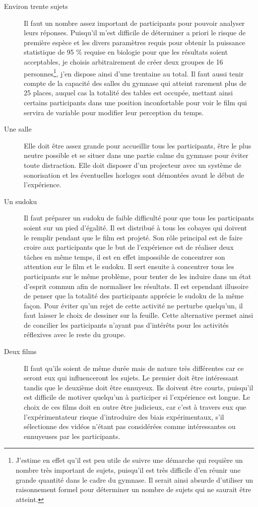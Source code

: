 \documentclass[12pt,fleqn,oneside,french,openany]{book} %
\begin{document}
\begin{description}
	\item[Environ trente sujets] Il faut un nombre assez important de participants pour pouvoir analyser leurs réponses. Puisqu'il m'est difficile de déterminer a priori le risque de première espèce et les divers paramètres requis pour obtenir la puissance statistique de 95 \% requise en biologie pour que les résultats soient acceptables, je choisis arbitrairement de créer deux groupes de 16 personnes\footnote{J'estime en effet qu'il est peu utile de suivre une démarche qui requière un nombre très important de sujets, puisqu'il est très difficile d'en réunir une grande quantité dans le cadre du gymnase. Il serait ainsi absurde d'utiliser un raisonnement formel pour déterminer un nombre de sujets qui ne saurait être atteint.}, j'en dispose ainsi d'une trentaine au total. Il faut aussi tenir compte de la capacité des salles du gymnase qui atteint rarement plus de 25 places, auquel cas la totalité des tables est occupée, mettant ainsi certains participants dans une position inconfortable pour voir le film qui servira de variable pour modifier leur perception du temps.
	\item[Une salle] Elle doit être assez grande pour accueillir tous les participants, être le plus neutre possible et se situer dans une partie calme du gymnase pour éviter toute distraction. Elle doit disposer d'un projecteur avec un système de sonorisation et les éventuelles horloges sont démontées avant le début de l'expérience.
	\item[Un sudoku] Il faut préparer un sudoku de faible difficulté pour que tous les participants soient sur un pied d'égalité. Il est distribué à tous les cobayes qui doivent le remplir pendant que le film est projeté. Son rôle principal est de faire croire aux participants que le but de l'expérience est de réaliser deux tâches en même temps, il est en effet impossible de concentrer son attention sur le film et le sudoku. Il sert ensuite à concentrer tous les participants sur le même problème, pour tenter de les induire dans un état d'esprit commun afin de normaliser les résultats. Il est cependant illusoire de penser que la totalité des participants apprécie le sudoku de la même façon. Pour éviter qu'un rejet de cette activité ne perturbe quelqu'un, il faut laisser le choix de dessiner sur la feuille. Cette alternative permet ainsi de concilier les participants n'ayant pas d'intérêts pour les activités réflexives avec le reste du groupe.
	\item[Deux films] Il faut qu'ils soient de même durée mais de nature très différentes car ce seront eux qui influenceront les sujets. Le premier doit être intéressant tandis que le deuxième doit être ennuyeux. Ils doivent être courts, puisqu'il est difficile de motiver quelqu'un à participer si l'expérience est longue. Le choix de ces films doit en outre être judicieux, car c'est à travers eux que l'expérimentateur risque d'introduire des biais expérimentaux, s'il sélectionne des vidéos n'étant pas considérées comme intéressantes ou ennuyeuses par les participants. 


\end{description}
\end{document}
